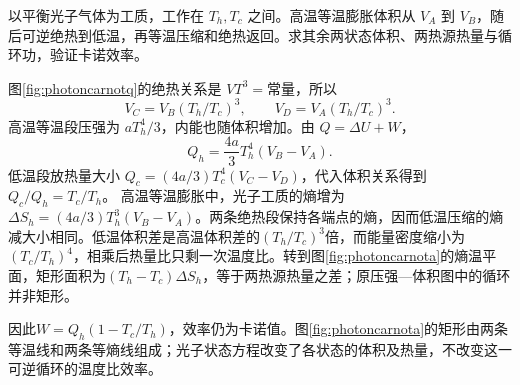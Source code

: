 \begin{example}[光子工质的卡诺循环]
以平衡光子气体为工质，工作在 $T_h,T_c$ 之间。高温等温膨胀体积从 $V_A$ 到 $V_B$，随后可逆绝热到低温，再等温压缩和绝热返回。求其余两状态体积、两热源热量与循环功，验证卡诺效率。
\end{example}
\begin{solution}
图\ref{fig:photoncarnotq}的绝热关系是 $VT^3=\text{常量}$，所以
\[
 V_C=V_B(T_h/T_c)^3,\qquad V_D=V_A(T_h/T_c)^3.
\]
高温等温段压强为 $aT_h^4/3$，内能也随体积增加。由 $Q=\Delta U+W$，
\[
 Q_h=\frac{4a}3T_h^4(V_B-V_A).
\]
低温段放热量大小 $Q_c=(4a/3)T_c^4(V_C-V_D)$，代入体积关系得到 $Q_c/Q_h=T_c/T_h$。
高温等温膨胀中，光子工质的熵增为$\Delta S_h=(4a/3)T_h^3(V_B-V_A)$。两条绝热段保持各端点的熵，因而低温压缩的熵减大小相同。低温体积差是高温体积差的$(T_h/T_c)^3$倍，而能量密度缩小为$(T_c/T_h)^4$，相乘后热量比只剩一次温度比。转到图\ref{fig:photoncarnota}的熵温平面，矩形面积为$(T_h-T_c)\Delta S_h$，等于两热源热量之差；原压强—体积图中的循环并非矩形。

因此$W=Q_h(1-T_c/T_h)$，效率仍为卡诺值。图\ref{fig:photoncarnota}的矩形由两条等温线和两条等熵线组成；光子状态方程改变了各状态的体积及热量，不改变这一可逆循环的温度比效率。
\end{solution}
